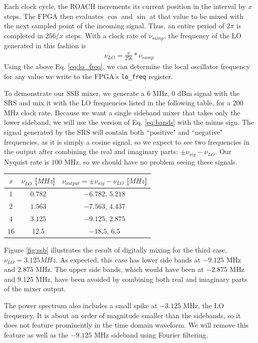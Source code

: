 \documentclass[12pt]{article}
\begin{document}
Each clock cycle, the ROACH increments its current position in the interval by $x$ steps. The FPGA then evaluates $\cos$ and $\sin$ at that value to be mixed with the next sampled point of the incoming signal. Thus, an entire period of $2\pi$ is completed in $256/x$ steps. With a clock rate of $\nu_{samp}$, the frequency of the LO generated in this fashion is
\begin{eqnarray}
\nu_{LO} = \frac{x}{256} * \nu_{samp} \label{eq:lo_freq}
\end{eqnarray}
Using the above Eq. \ref{eq:lo_freq}, we can determine the local oscillator frequency for any value we write to the FPGA's \texttt{lo\_freq} register.

To demonstrate our SSB mixer, we generate a $6$ MHz, $0$ dBm signal with the SRS and mix it with the LO frequencies listed in the following table, for a $200$ MHz clock rate. Because we want a single sideband mixer that takes only the lower sideband, we will use the version of Eq. \ref{eq:bands} with the minus sign. The signal generated by the SRS will contain both ``positive" and ``negative" frequencies, as it is simply a cosine signal, so we expect to see two frequencies in the output after combining the real and imaginary parts: $\pm \nu_{sig} - \nu_{LO}$. Our Nyquist rate is $100$ MHz, so we should have no problem seeing these signals.
\begin{center}
  \begin{tabular}{ c | c | c }
    $x$ & $\nu_{LO}$ [$MHz$] & $\nu_{output} = \pm \nu_{sig} - \nu_{LO}$ [$MHz$]\\ \hline
    $1$ & $0.782 $ & $-6.782$, $5.218 $ \\
    $2$ & $1.563 $ & $-7.563$, $4.437$\\
    $4$ & $3.125 $ & $-9.125$, $2.875$ \\
    $16$ & $12.5 $ & $-18.5$, $6.5$\\
  \end{tabular}
\end{center}

Figure \ref{fig:ssb} illustrates the result of digitally mixing for the third case, $\nu_{LO} = 3.125 MHz$. As expected, this case has lower side bands at $-9.125$ MHz and $2.875$ MHz. The upper side bands, which would have been at $-2.875$ MHz and $9.125$ MHz, have been avoided by combining both real and imaginary parts of the mixer output.

The power spectrum also includes a small spike at $-3.125$ MHz, the LO frequency. It is about an order of magnitude smaller than the sidebands, so it does not feature prominently in the time domain waveform. We will remove this feature as well as the $-9.125$ MHz sideband using Fourier filtering.
\end{document}
